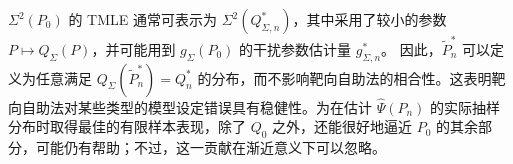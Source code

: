 $\Sigma^2(P_0)$ 的 TMLE 通常可表示为 $\Sigma^2(Q_{\Sigma,n}^*)$，其中采用了较小的参数 $P\mapsto Q_\Sigma(P)$，并可能用到 $g_\Sigma(P_0)$ 的干扰参数估计量 $g_{\Sigma,n}^*$。
因此，$\tilde P_n^*$ 可以定义为任意满足
$Q_\Sigma(\tilde P_n^*)=Q_n^*$ 的分布，而不影响靶向自助法的相合性。这表明靶向自助法对某些类型的模型设定错误具有稳健性。为在估计 $\hat\Psi(P_n)$ 的实际抽样分布时取得最佳的有限样本表现，除了 $Q_0$ 之外，还能很好地逼近 $P_0$ 的其余部分，可能仍有帮助；不过，这一贡献在渐近意义下可以忽略。
